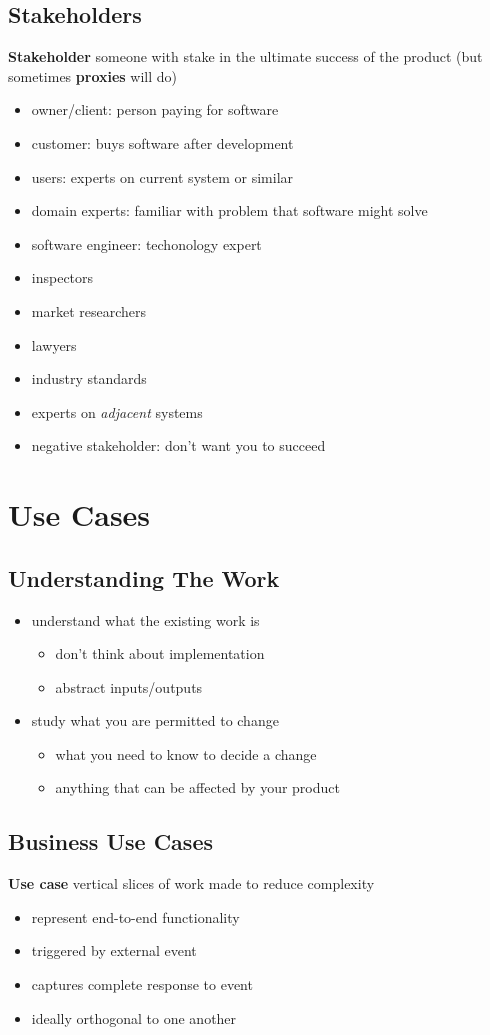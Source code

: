 \documentclass[]{article}
\theoremstyle{definition}
\begin{document}
	\subsection{Stakeholders}
	\textbf{Stakeholder} someone with stake in the ultimate success of the product (but sometimes \textbf{proxies} will do)
	\begin{itemize}
		\item owner/client: person paying for software
		\item customer: buys software after development
		\item users: experts on current system or similar
		\item domain experts: familiar with problem that software might solve
		\item software engineer: techonology expert
		\item inspectors
		\item market researchers
		\item lawyers
		\item industry standards
		\item experts on \textit{adjacent} systems
		\item negative stakeholder: don't want you to succeed
	\end{itemize}

	\section{Use Cases}
	\subsection{Understanding The Work}
	\begin{itemize}
		\item understand what the existing work is
			\begin{itemize}
				\item don't think about implementation
				\item abstract inputs/outputs
			\end{itemize}
		\item study what you are permitted to change
			\begin{itemize}
				\item what you need to know to decide a change
				\item anything that can be affected by your product
			\end{itemize}
	\end{itemize}
	\subsection{Business Use Cases}
	\textbf{Use case} vertical slices of work made to reduce complexity
	\begin{itemize}
		\item represent end-to-end functionality
		\item triggered by external event
		\item captures complete response to event
		\item ideally orthogonal to one another
	\end{itemize}
\end{document}
